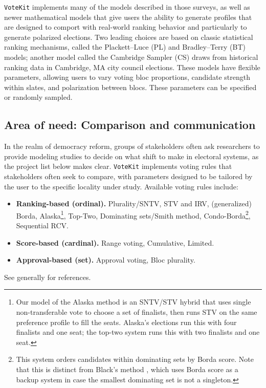 \documentclass{article}
\newcommand{\VK}{{\tt VoteKit}\xspace}
\begin{document}
\VK implements many of the models described in those surveys, as well as newer mathematical models that give users the ability to generate profiles that are designed to comport with real-world ranking behavior and particularly to generate polarized elections.  Two leading choices are based on classic statistical ranking mechanisms, called the Plackett--Luce (PL) and Bradley--Terry (BT) models;  another model called the Cambridge Sampler (CS) draws from historical ranking data in Cambridge, MA city council elections.
These models have flexible parameters, allowing users to vary voting bloc proportions, candidate strength within slates, and polarization between blocs.  These parameters can be specified or randomly sampled.  



\clearpage
\subsection{Area of need: Comparison and communication}

In the realm of democracy reform, groups of stakeholders often ask researchers to provide modeling studies to decide on what shift to make in electoral systems, as the project list below makes clear.  
\VK implements voting rules that stakeholders often seek to compare, with parameters designed to be tailored by the user to the specific locality under study. Available voting rules include:
\begin{itemize}
    \item {\bf Ranking-based (ordinal).} Plurality/SNTV, STV and IRV,
(generalized) Borda, Alaska\footnote{Our model of the Alaska method is an SNTV/STV hybrid that uses single non-transferable vote to choose a set of finalists, then runs STV on the same preference profile to fill the seats.  Alaska's elections run this with four finalists and one seat; the top-two system runs this with two finalists and one seat.},  Top-Two, 
Dominating sets/Smith method, Condo-Borda\footnote{This system orders candidates within dominating sets by Borda score. Note that this is distinct from  Black's method \cite{Black}, which uses Borda score as a backup system in case the smallest dominating set is not a singleton.}, Sequential RCV. 
    \item {\bf Score-based (cardinal).} Range voting, Cumulative, Limited. 
    \item {\bf Approval-based (set).}  Approval voting, Bloc plurality.
\end{itemize}
See generally \cite{electoralhandbook,STV,Borda,TopTwo,SequentialRCV} for references.
\end{document}

